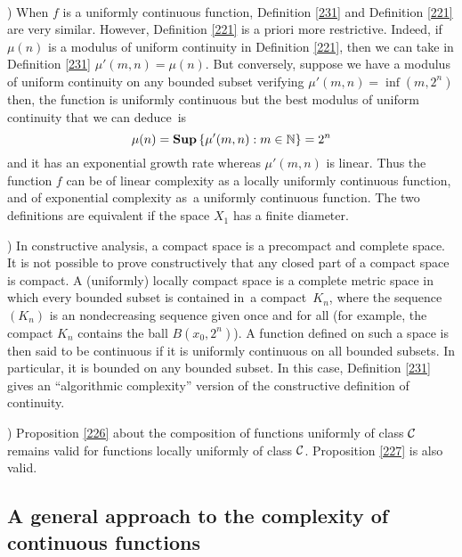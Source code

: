 \begin{remarks}\label{233} ~

) When $f$ is a uniformly continuous function, Definition \ref{231} and Definition \ref{221} are very similar. However, Definition \ref{221} is a priori more restrictive. Indeed, if $\mu(n)$ is a modulus of uniform continuity in Definition \ref{221}, then we can take in Definition \ref{231} $\mu'(m,n) = \mu(n)$. 
But conversely, suppose we have a modulus of uniform continuity on any bounded subset verifying $\mu'(m,n) = \inf(m, 2^n)$ then, the function is uniformly continuous but the best modulus of uniform continuity that we can deduce~is 
\[
\mu(n) = {\bf Sup} \left\{ \mu'(m,n): m \in \mathbb {N} \right\} = 2^n
\]
and it has an exponential growth rate whereas $\mu'(m,n)$ is linear. Thus the function $f$ can be of linear complexity as a locally uniformly continuous function, and of exponential complexity as~a uniformly continuous function. 
The two definitions are equivalent if the space $X_1$ has a finite diameter.


) In constructive analysis, a compact space is a precompact and complete space. It is not possible to prove constructively that any closed part of a compact space is compact. A (uniformly) locally compact space is a complete metric space in which every bounded subset is contained in~a compact~$K_n$, where the sequence $(K_n)$ is an nondecreasing sequence given once and for all (for example, the compact $K_n$ contains the ball $B(x_0, 2^n)$). A function defined on such a space is then said to be continuous if it is uniformly continuous on all bounded subsets. In particular, it is bounded on any bounded subset. In this case, Definition \ref{231} gives an ``algorithmic complexity'' version of the constructive definition of continuity.


) Proposition \ref{226} about the composition of functions uniformly of class ${{\cal C}}$ remains valid for functions locally uniformly of class ${{\cal C}}$. Proposition \ref{227} is also valid.
\end{remarks}


\subsection{A general approach to the complexity of continuous functions} 
\label{subsec24}
 
